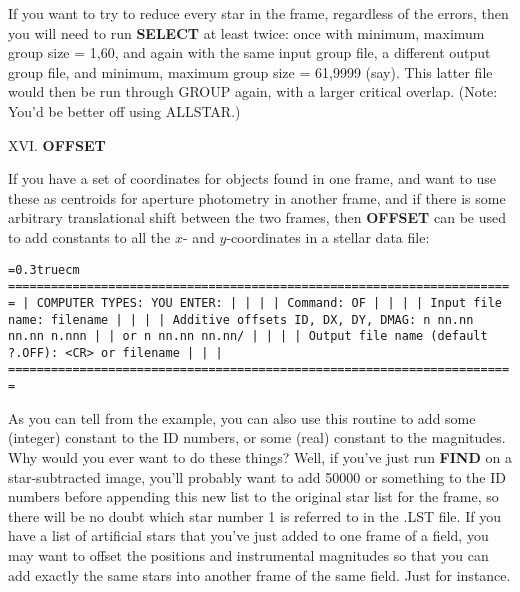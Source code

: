 \noindent If you want to try to reduce every star in the frame,
regardless of the errors, then you will need to run {\bf SELECT} at
least twice:  once with minimum, maximum group size = 1,60, and again
with the same input group file, a different output group file, and
minimum, maximum group size = 61,9999 (say).  This latter file would
then be run through GROUP again, with a larger critical overlap.  (Note:
You'd be better off using ALLSTAR.)

\vfill 
\eject 
\noindent XVI.  {\bf OFFSET}

If you have a set of coordinates for objects found in one frame,
and want to use these as centroids for aperture photometry in another
frame, and if there is some arbitrary translational shift between the
two frames, then {\bf OFFSET} can be used to add constants to all the
$x$- and $y$-coordinates in a stellar data file: 

\bigskip
{\noindent\obeylines\obeyspaces\frenchspacing\tt\baselineskip=0.3truecm
=======================================================================
| COMPUTER TYPES:                               YOU ENTER:            |
|                                                                     |
| Command:                                      OF                    |
|                                                                     |
|                    Input file name:           filename              |
|                                                                     |
|  Additive offsets ID, DX, DY, DMAG:           n nn.nn nn.nn n.nnn   |
|                                            or n nn.nn nn.nn/        |
|                                                                     |
|   Output file name (default ?.OFF):           <CR> or filename      |
|                                                                     |
=======================================================================
}
\bigskip

\noindent As you can tell from the example, you can also use this
routine to add some (integer) constant to the ID numbers, or some
(real) constant to the magnitudes.  Why would you ever want to do these
things?  Well, if you've just run {\bf FIND} on a star-subtracted
image, you'll probably want to add 50000 or something to the ID numbers
before appending this new list to the original star list for the frame,
so there will be no doubt which star number 1 is referred to in the
.LST file.  If you have a list of artificial stars that you've just
added to one frame of a field, you may want to offset the positions and
instrumental magnitudes so that you can add exactly the same stars into
another frame of the same field.  Just for instance.

